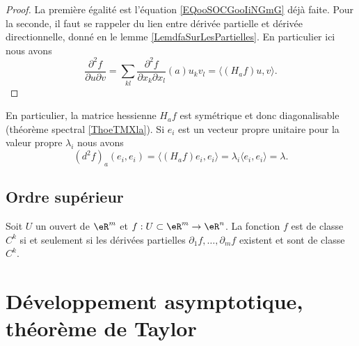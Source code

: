 \begin{proof}
    La première égalité est l'équation \eqref{EQooSOCGooIiNGmG} déjà faite. Pour la seconde, il faut se rappeler du lien entre dérivée partielle et dérivée directionnelle, donné en le lemme \ref{LemdfaSurLesPartielles}. En particulier ici nous avons
    \begin{equation}
        \frac{ \partial^2f }{ \partial u\partial v }=\sum_{kl}\frac{ \partial^2f }{ \partial x_k\partial x_l  }(a)u_kv_l=\langle (H_af)u, v\rangle .
    \end{equation}
\end{proof}

En particulier, la matrice hessienne \( H_af\) est symétrique et donc diagonalisable (théorème spectral \ref{ThoeTMXla}). Si \( e_i\) est un vecteur propre unitaire pour la valeur propre \( \lambda_i\) nous avons
\begin{equation}
    (d^2f)_a(e_i,e_i)=\langle (H_af)e_i, e_i\rangle =\lambda_i\langle e_i, e_i\rangle =\lambda.
\end{equation}

\subsection{Ordre supérieur}

\begin{proposition} \label{PropDYKooHvrfGw}
    Soit $U$ un ouvert de $\eR^m$ et  $f:U\subset\eR^m\to \eR^n$. La fonction $f$ est de classe $C^k$ si et seulement si les dérivées partielles $\partial_1 f, \ldots, \partial_m f $ existent et sont de classe $C^{k}$. 
\end{proposition}

\section{Développement asymptotique, théorème de Taylor}
\label{AppSecTaylorR}

